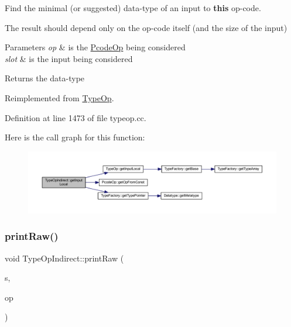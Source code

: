 Find the minimal (or suggested) data-\/type of an input to {\bfseries{this}} op-\/code. 

The result should depend only on the op-\/code itself (and the size of the input) 
\begin{DoxyParams}{Parameters}
{\em op} & is the \mbox{\hyperlink{class_pcode_op}{Pcode\+Op}} being considered \\
\hline
{\em slot} & is the input being considered \\
\hline
\end{DoxyParams}
\begin{DoxyReturn}{Returns}
the data-\/type 
\end{DoxyReturn}


Reimplemented from \mbox{\hyperlink{class_type_op_abe2e4b619932cf94bafb084963a0fc66}{Type\+Op}}.



Definition at line 1473 of file typeop.\+cc.

Here is the call graph for this function\+:
\nopagebreak
\begin{figure}[H]
\begin{center}
\leavevmode
\includegraphics[width=350pt]{class_type_op_indirect_a556bb0789c0ef43a825befed5f4068c4_cgraph}
\end{center}
\end{figure}
\mbox{\label{class_type_op_indirect_a26e28dde9299bf0eb6ba5277ea7000c0}} 
\subsubsection{\texorpdfstring{printRaw()}{printRaw()}}
{\footnotesize\ttfamily void Type\+Op\+Indirect\+::print\+Raw (\begin{DoxyParamCaption}\item[{ostream \&}]{s,  }\item[{const \mbox{\hyperlink{class_pcode_op}{Pcode\+Op}} $\ast$}]{op }\end{DoxyParamCaption})\hspace{0.3cm}{\ttfamily [virtual]}}



